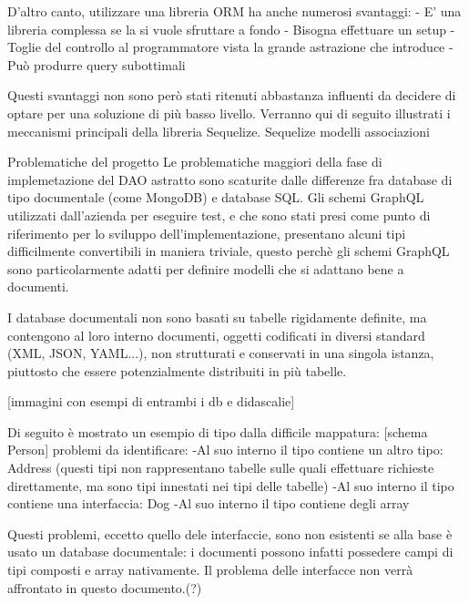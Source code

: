         D'altro canto, utilizzare una libreria ORM ha anche numerosi svantaggi:
            - E' una libreria complessa se la si vuole sfruttare a fondo
            - Bisogna effettuare un setup
            - Toglie del controllo al programmatore vista la grande astrazione che introduce
            - Può produrre query subottimali

        Questi svantaggi non sono però stati ritenuti abbastanza influenti da decidere di optare per una soluzione di più basso livello.
        Verranno qui di seguito illustrati i meccanismi principali della libreria Sequelize.
        Sequelize
        modelli
        associazioni

    Problematiche del progetto
        Le problematiche maggiori della fase di implemetazione del DAO astratto sono scaturite dalle differenze fra database di tipo documentale (come MongoDB) e database SQL.
        Gli schemi GraphQL utilizzati dall'azienda per eseguire test, e che sono stati presi come punto di riferimento per lo sviluppo dell'implementazione, presentano alcuni tipi difficilmente convertibili in maniera triviale, questo perchè gli schemi GraphQL sono
        particolarmente adatti per definire modelli che si adattano bene a documenti.

        I database documentali non sono basati su tabelle rigidamente definite, ma contengono al loro interno documenti, oggetti codificati in diversi standard (XML, JSON, YAML...), non strutturati e conservati in una singola istanza, piuttosto che essere potenzialmente distribuiti in più tabelle.
        
        [immagini con esempi di entrambi i db e didascalie]

        Di seguito è mostrato un esempio di tipo dalla difficile mappatura:
        [schema Person]
        problemi da identificare:
            -Al suo interno il tipo contiene un altro tipo: Address (questi tipi non rappresentano tabelle sulle quali effettuare richieste direttamente, ma sono tipi innestati nei tipi delle tabelle)
            -Al suo interno il tipo contiene una interfaccia: Dog
            -Al suo interno il tipo contiene degli array

        Questi problemi, eccetto quello dele interfaccie, sono non esistenti se alla base è usato un database documentale: i documenti possono infatti possedere campi di tipi composti e array nativamente. 
        Il problema delle interfacce non verrà affrontato in questo documento.(?)

